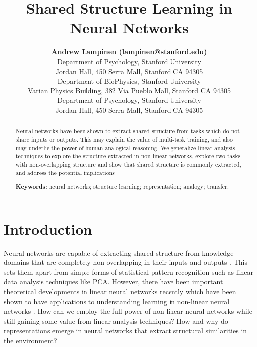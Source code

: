 \documentclass[10pt,letterpaper]{article}
\title{Shared Structure Learning in Neural Networks}
\author{{\large \bf Andrew Lampinen (lampinen@stanford.edu)} \\
  Department of Psychology, Stanford University \\
  Jordan Hall, 450 Serra Mall, Stanford CA 94305 
  \AND {\large \bf Shaw Hsu (cshawhsu@stanford.edu)} \\
  Department of BioPhysics, Stanford University \\
  Varian Physics Building, 382 Via Pueblo Mall, Stanford CA 94305
  \AND {\large \bf James L. McClelland (mcclelland@stanford.edu)} \\
  Department of Psychology, Stanford University \\
  Jordan Hall, 450 Serra Mall, Stanford CA 94305}
\begin{document}
\maketitle


\begin{abstract}
Neural networks have been shown to extract shared structure from tasks which do not share inputs or outputs. This may explain the value of multi-task training, and also may underlie the power of human analogical reasoning. We generalize linear analysis techniques to explore the structure extracted in non-linear networks, explore two tasks with non-overlapping structure and show that shared structure is commonly extracted, and address the potential implications 

\textbf{Keywords:} 
neural networks; structure learning; representation; analogy; transfer; 
\end{abstract}


\section{Introduction}
Neural networks are capable of extracting shared structure from knowledge domains that are completely non-overlapping in their inputs and outputs \citep{Hinton1986,Rogers2008}. This sets them apart from simple forms of statistical pattern recognition \citep{Rogers2008} such as linear data analysis techniques like PCA. However, there have been important theoretical developments in linear neural networks recently which have been shown to have applications to understanding learning in non-linear neural networks \citep{Saxe2013}. How can we employ the full power of non-linear neural networks while still gaining some value from linear analysis techniques? How and why do representations emerge in neural networks that extract structural similarities in the environment? \par 
\end{document}
